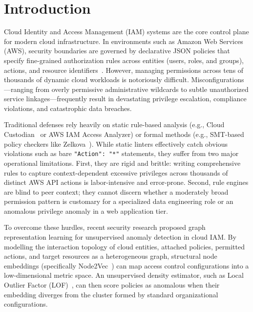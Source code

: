 \section{Introduction}
\label{sec:intro}

Cloud Identity and Access Management (IAM) systems are the core control plane for modern cloud infrastructure. In environments such as Amazon Web Services (AWS), security boundaries are governed by declarative JSON policies that specify fine-grained authorization rules across entities (users, roles, and groups), actions, and resource identifiers~\cite{aws2023iam}. However, managing permissions across tens of thousands of dynamic cloud workloads is notoriously difficult. Misconfigurations---ranging from overly permissive administrative wildcards to subtle unauthorized service linkages---frequently result in devastating privilege escalation, compliance violations, and catastrophic data breaches.

Traditional defenses rely heavily on static rule-based analysis (e.g., Cloud Custodian~\cite{cloudcustodian2023} or AWS IAM Access Analyzer) or formal methods (e.g., SMT-based policy checkers like Zelkova~\cite{backes2018semantic}). While static linters effectively catch obvious violations such as bare \texttt{"Action": "*"} statements, they suffer from two major operational limitations. First, they are rigid and brittle: writing comprehensive rules to capture context-dependent excessive privileges across thousands of distinct AWS API actions is labor-intensive and error-prone. Second, rule engines are blind to peer context; they cannot discern whether a moderately broad permission pattern is customary for a specialized data engineering role or an anomalous privilege anomaly in a web application tier.

To overcome these hurdles, recent security research proposed graph representation learning for unsupervised anomaly detection in cloud IAM. By modelling the interaction topology of cloud entities, attached policies, permitted actions, and target resources as a heterogeneous graph, structural node embeddings (specifically Node2Vec~\cite{grover2016node2vec}) can map access control configurations into a low-dimensional metric space. An unsupervised density estimator, such as Local Outlier Factor (LOF)~\cite{breunig2000lof}, can then score policies as anomalous when their embedding diverges from the cluster formed by standard organizational configurations.


